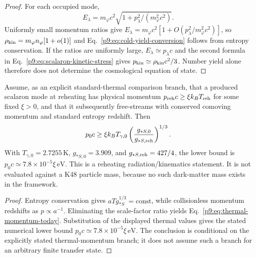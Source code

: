 \documentclass[12pt,a4paper]{article}
\begin{document}
\begin{proof}
For each occupied mode,
\[
E_\lambda=m_\varphi c^2\sqrt{1+p_\lambda^2/(m_\varphi^2c^2)}.
\]
Uniformly small momentum ratios give
\(E_\lambda=m_\varphi c^2[1+O(p_\lambda^2/m_\varphi^2c^2)]\), so
\(\rho_{\rm kin}=m_\varphi n_\varphi[1+o(1)]\) and
Eq.~\eqref{p9:eq:cold-yield-conversion} follows from entropy conservation.  If
the ratios are uniformly large, \(E_\lambda\simeq p_\lambda c\) and the second
formula in Eq.~\eqref{p9:eq:scalaron-kinetic-stress} gives
\(p_{\rm kin}\simeq\rho_{\rm kin}c^2/3\).  Number yield alone therefore does
not determine the cosmological equation of state.
\end{proof}

\begin{proposition}
\label{p9:prop:thermal-freezein-not-cold}
Assume, as an explicit standard-thermal comparison branch, that a produced
scalaron mode at reheating has physical momentum
\(p_{\rm reh}c\ge \xi k_BT_{\rm reh}\) for some fixed \(\xi>0\), and that it
subsequently free-streams with conserved comoving momentum and standard entropy
redshift.  Then
\begin{equation}
\label{p9:eq:thermal-momentum-today}
p_0c\ge \xi k_BT_{\gamma,0}
\left(\frac{g_{*S,0}}{g_{*S,\rm reh}}\right)^{1/3}.
\end{equation}
With \(T_{\gamma,0}=2.7255\,\mathrm K\),
\(g_{*S,0}=3.909\), and \(g_{*S,\rm reh}=427/4\), the lower bound is
\(p_0c\simeq7.8\times10^{-5}\xi\,\mathrm{eV}\).  This is a reheating
radiation/kinematics statement.  It is not evaluated against a K48 particle
mass, because no such dark-matter mass exists in the framework.
\end{proposition}

\begin{proof}
Entropy conservation gives
\(aTg_{*S}^{1/3}=\mathrm{const}\), while collisionless momentum redshifts as
\(p\propto a^{-1}\).  Eliminating the scale-factor ratio yields
Eq.~\eqref{p9:eq:thermal-momentum-today}.  Substitution of the displayed
thermal values gives the stated numerical lower bound
\(p_0c\simeq7.8\times10^{-5}\xi\,\mathrm{eV}\).  The conclusion is
conditional on the explicitly stated thermal-momentum branch; it does not
assume such a branch for an arbitrary finite transfer state.
\end{proof}
\end{document}
